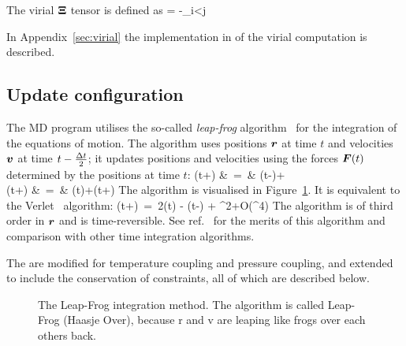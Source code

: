 The virial ${\bf \Xi}$ tensor is defined as 
\beq
{\bf \Xi} = -\half \sum_{i<j} \rvij \otimes \Fvij 
\eeq

In Appendix~\ref{sec:virial} the
implementation  in {\gromacs} of the virial computation is described.

\subsection{Update configuration}
\label{subsec:update}

The {\gromacs} MD program utilises the so-called {\em leap-frog} 
algorithm~\cite{Hockney74} for the integration of the equations of
motion.  The  
algorithm uses positions $\mbox{\boldmath ${r}$}$ at time $t$ and
velocities $\mbox{\boldmath ${v}$}$ at time $t-{\frac {\Delta t}{2}}$; it updates positions and
velocities using the forces
$\mbox{\boldmath ${F}$}(t)$ determined by the positions at time $t$: 
\bea
{}(t+\hDt)	&~=~&	(t-\hDt)+\Dt	\\
(t+\Dt)	&~=~&	(t)+(t+\hDt)\Dt
\eea
The algorithm is visualised in Figure~\ref{fig:leapfrog}.
It is equivalent to the Verlet~\cite{Verlet67} algorithm:
\beq
{}(t+\Dt)~=~2(t) - (t-\Dt) + \Dt^2+O(\Dt^4)
\eeq
The algorithm is of third order in $\mbox{\boldmath ${r}$}$ and is time-reversible.
See ref.~\cite{Berendsen86b} for the merits of this algorithm and comparison
with other time integration algorithms.
 
The  are modified for temperature coupling
 and pressure coupling, and extended to include the conservation of
constraints, all of which are described below.
\begin {figure}
\centerline{}
\caption[The Leap-Frog integration method.]{The Leap-Frog integration method. The algorithm is called
Leap-Frog  (Haasje Over), because r and v are leaping
like  frogs over each others back.}
\label{fig:leapfrog}
\end {figure}

